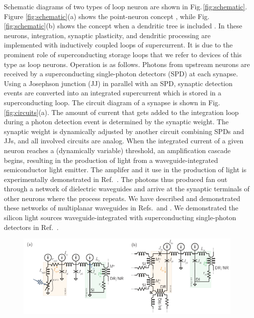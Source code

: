 \documentclass[]{article}
\newcommand{\onlinecite}[1]{\hspace{-1 ex} \nocite{#1}\citenum{#1}}
\begin{document}
Schematic diagrams of two types of loop neuron are shown in Fig.\,\ref{fig:schematic}. Figure \ref{fig:schematic}(a) shows the point-neuron concept \cite{sh2018,sh2019_jap}, while Fig.\,\ref{fig:schematic}(b) shows the concept when a dendritic tree is included \cite{sh2019_jstqe}. In these neurons, integration, synaptic plasticity, and dendritic processing are implemented with inductively coupled loops of supercurrent. It is due to the prominent role of superconducting storage loops that we refer to devices of this type as loop neurons. Operation is as follows. Photons from upstream neurons are received by a superconducting single-photon detectors (SPD) at each synapse. Using a Josephson junction (JJ) in parallel with an SPD, synaptic detection events are converted into an integrated supercurrent which is stored in a superconducting loop. The circuit diagram of a synapse is shown in Fig.\,\ref{fig:circuits}(a). The amount of current that gets added to the integration loop during a photon detection event is determined by the synaptic weight. The synaptic weight is dynamically adjusted by another circuit combining SPDs and JJs, and all involved circuits are analog. When the integrated current of a given neuron reaches a (dynamically variable) threshold, an amplification cascade begins, resulting in the production of light from a waveguide-integrated semiconductor light emitter. The amplifer and it use in the production of light is experimentally demonstrated in Ref.\,\onlinecite{mcve2019}. The photons thus produced fan out through a network of dielectric waveguides and arrive at the synaptic terminals of other neurons where the process repeats. We have described and demonstrated these networks of multiplanar waveguides in Refs.\,\onlinecite{chbu2017} and \onlinecite{chbu2018}. We demonstrated the silicon light sources waveguide-integrated with superconducting single-photon detectors in Ref.\,\onlinecite{buch2017}.

\begin{figure}
\centering
\includegraphics[width=17.2cm]{_02__circuits.pdf}
\end{figure}
\end{document}
